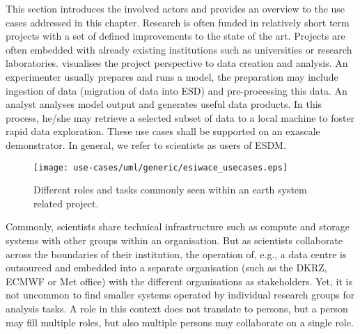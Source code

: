 This section introduces the involved actors and provides an overview to the use cases addressed in this chapter.
Research is often funded in relatively short term projects with a set of defined improvements to the state of the art.
Projects are often embedded with already existing institutions such as universities or research laboratories.
 visualises the project perspective to data creation and analysis.
An experimenter usually prepares and runs a model, the preparation may include ingestion of data (migration of data into ESD) and pre-processing this data.
An analyst analyses model output and generates useful data products.
In this process, he/she may retrieve a selected subset of data to a local machine to foster rapid data exploration.
These use cases shall be supported on an exascale demonstrator.
In general, we refer to scientists as users of ESDM.



\begin{figure}
	\centering
	\texttt{[image: use-cases/uml/generic/esiwace\_usecases.eps]}
	\caption{Different roles and tasks commonly seen within an earth system related project.}
	\label{fig:esiwace_usecases}
\end{figure}



\medskip

Commonly, scientists share technical infrastructure such as compute and storage systems with other groups within an organisation.
But as scientists collaborate across the boundaries of their institution, the operation of, e.g., a data centre is outsourced and embedded into a separate organisation (such as the DKRZ, ECMWF or Met office) with the different organisations as stakeholders.
Yet, it is not uncommon to find smaller systems operated by individual research groups for analysis tasks.
A role in this context does not translate to persons, but a person may fill multiple roles, but also multiple persons may collaborate on a single role.




